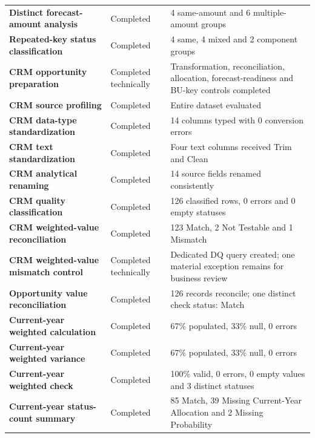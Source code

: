 \documentclass[11pt,a4paper]{article}
\begin{document}
\begin{tabularx}{\textwidth}{
    >{\bfseries}p{5.8cm}
    p{2.8cm}
    X
}
Distinct forecast-amount analysis
&
Completed
&
4 same-amount and 6 multiple-amount groups
\\

Repeated-key status classification
&
Completed
&
4 same, 4 mixed and 2 component groups
\\

CRM opportunity preparation
&
Completed technically
&
Transformation, reconciliation, allocation, forecast-readiness and BU-key controls completed
\\

CRM source profiling
&
Completed
&
Entire dataset evaluated
\\

CRM data-type standardization
&
Completed
&
14 columns typed with 0 conversion errors
\\

CRM text standardization
&
Completed
&
Four text columns received Trim and Clean
\\

CRM analytical renaming
&
Completed
&
14 source fields renamed consistently
\\

CRM quality classification
&
Completed
&
126 classified rows, 0 errors and 0 empty statuses
\\

CRM weighted-value reconciliation
&
Completed
&
123 Match, 2 Not Testable and 1 Mismatch
\\

CRM weighted-value mismatch control
&
Completed technically
&
Dedicated DQ query created; one material exception remains for business review
\\

Opportunity value reconciliation
&
Completed
&
126 records reconcile; one distinct check status: Match
\\

Current-year weighted calculation
&
Completed
&
67\% populated, 33\% null, 0 errors
\\

Current-year weighted variance
&
Completed
&
67\% populated, 33\% null, 0 errors
\\

Current-year weighted check
&
Completed
&
100\% valid, 0 errors, 0 empty values and 3 distinct statuses
\\

Current-year status-count summary
&
Completed
&
85 Match, 39 Missing Current-Year Allocation and 2 Missing Probability
\\


\end{tabularx}
\end{document}
